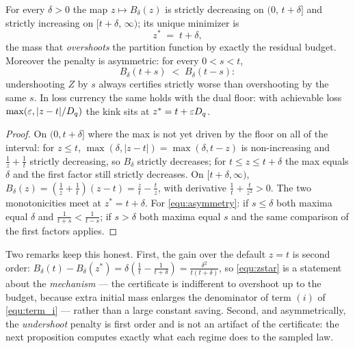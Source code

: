 \begin{proposition}
\label{prop:overshoot}
For every $\delta>0$ the map $z\mapsto B_\delta(z)$ is strictly decreasing on
$(0,\,t+\delta]$ and strictly increasing on $[t+\delta,\,\infty)$; its unique minimizer is
\begin{equation}\label{equ:zstar}
    z^*\;=\;t+\delta ,
\end{equation}
the mass that \emph{overshoots} the partition function by exactly the residual budget.
Moreover the penalty is asymmetric: for every $0<s<t$,
\begin{equation}\label{equ:asymmetry}
    B_\delta(t+s)\;<\;B_\delta(t-s):
\end{equation}
undershooting $Z$ by $s$ always certifies strictly worse than overshooting by the same
$s$. In loss currency the same holds with the dual floor: with achievable loss
$\max(\varepsilon,|z-t|/D_{q})$ the kink sits at $z^*=t+\varepsilon D_{q}$.
\end{proposition}

\begin{proof}
On $(0,t+\delta]$ where the max is not yet driven by the floor on all of the interval:
for $z\leq t$, $\max(\delta,|z-t|)=\max(\delta,t-z)$ is non-increasing and $\frac1z+\frac1t$
strictly decreasing, so $B_\delta$ strictly decreases; for $t\leq z\leq t+\delta$ the max
equals $\delta$ and the first factor still strictly decreases. On $[t+\delta,\infty)$,
$B_\delta(z)=\left(\frac1z+\frac1t\right)(z-t)=\frac zt-\frac tz$, with derivative
$\frac1t+\frac t{z^2}>0$. The two monotonicities meet at $z^*=t+\delta$. For
\eqref{equ:asymmetry}: if $s\leq\delta$ both maxima equal $\delta$ and
$\frac1{t+s}<\frac1{t-s}$; if $s>\delta$ both maxima equal $s$ and the same comparison of
the first factors applies.
\end{proof}

Two remarks keep this honest. First, the gain over the default $z=t$ is second order:
$B_\delta(t)-B_\delta(z^*)=\delta\left(\frac1t-\frac1{t+\delta}\right)
=\frac{\delta^2}{t(t+\delta)}$, so \eqref{equ:zstar} is a statement about the
\emph{mechanism} --- the certificate is indifferent to overshoot up to the budget, because
extra initial mass enlarges the denominator of term $(i)$ of
\eqref{equ:term_i} --- rather than a large constant saving. Second, and asymmetrically,
the \emph{undershoot} penalty is first order and is not an artifact of the certificate:
the next proposition computes exactly what each regime does to the sampled law.

